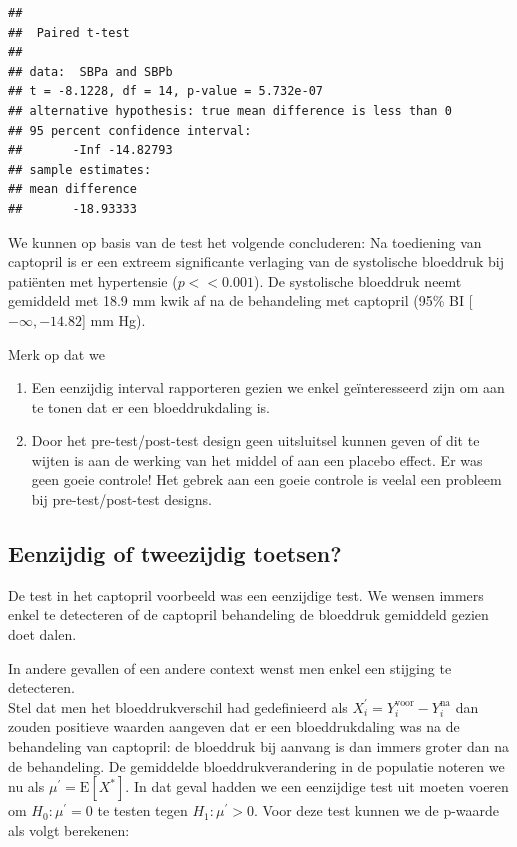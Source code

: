 \documentclass[
  12pt,dutch]{book}
\providecommand{\tightlist}{%
  \setlength{\itemsep}{0pt}\setlength{\parskip}{0pt}}
\theoremstyle{definition}
\theoremstyle{definition}
\theoremstyle{definition}
\theoremstyle{definition}
\theoremstyle{remark}
\begin{document}
\begin{verbatim}
## 
##  Paired t-test
## 
## data:  SBPa and SBPb
## t = -8.1228, df = 14, p-value = 5.732e-07
## alternative hypothesis: true mean difference is less than 0
## 95 percent confidence interval:
##       -Inf -14.82793
## sample estimates:
## mean difference 
##       -18.93333
\end{verbatim}

We kunnen op basis van de test het volgende concluderen:
Na toediening van captopril is er een extreem significante verlaging van de systolische bloeddruk bij patiënten met hypertensie
(\(p << 0.001\)). De systolische bloeddruk neemt gemiddeld met 18.9 mm kwik af na de behandeling met captopril (95\% BI {[}\(-\infty,-14.82\){]} mm Hg).

Merk op dat we

\begin{enumerate}
\def\labelenumi{\arabic{enumi}.}
\tightlist
\item
  Een eenzijdig interval rapporteren gezien we enkel geïnteresseerd zijn om aan te tonen dat er een bloeddrukdaling is.
\item
  Door het pre-test/post-test design geen uitsluitsel kunnen geven of dit te wijten is aan de werking van het middel of aan een placebo effect. Er was geen goeie controle! Het gebrek aan een goeie controle is veelal een probleem bij pre-test/post-test designs.
\end{enumerate}

\subsection{Eenzijdig of tweezijdig toetsen?}\label{eenzijdig-of-tweezijdig-toetsen}

De test in het captopril voorbeeld was een eenzijdige test. We wensen immers enkel te detecteren of de captopril behandeling de bloeddruk gemiddeld gezien doet dalen.

In andere gevallen of een andere context wenst men enkel een stijging te detecteren.\\
Stel dat men het bloeddrukverschil had gedefinieerd als \(X_{i}^\prime=Y_{i}^\text{voor}-Y_{i}^\text{na}\) dan zouden positieve waarden aangeven dat er een bloeddrukdaling was na de behandeling van captopril: de bloeddruk bij aanvang is dan immers groter dan na de behandeling.
De gemiddelde bloeddrukverandering in de populatie noteren we nu als \(\mu^\prime=\text{E}[X^*]\).
In dat geval hadden we een eenzijdige test uit moeten voeren om \(H_0: \mu^\prime=0\) te testen tegen \(H_1: \mu^\prime>0\).
Voor deze test kunnen we de p-waarde als volgt berekenen:
\end{document}
